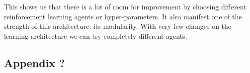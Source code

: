 \documentclass[11pt,a4paper,twoside]{report}
\newcommand{\+}{\textnormal{+} }
\theoremstyle{definition}
\numberwithin{equation}{chapter}
\begin{document}
This shows us that there is a lot of room for improvement by choosing different 
reinforcement learning agents or hyper-parameters. It also manifest one of the 
strength of this architecture: its modularity. With very few changes on the 
learning architecture we can try completely different agents.

%
%






\begin{appendix}
%
%






%
%




%
%






\chapter{Appendix ?} \label{app:pgm}

\blindtext







%
%
%
% 




\end{appendix}
\end{document}
